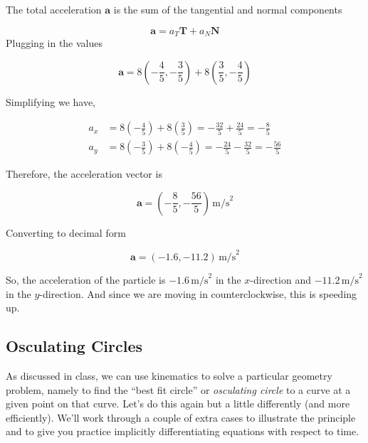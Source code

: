 \documentclass[12pt]{article}
\begin{document}
\begin{enumerate}
The total acceleration \(\mathbf{a}\) is the sum of the tangential and normal components

\[
\mathbf{a} = a_T \mathbf{T} + a_N \mathbf{N}
\]
Plugging in the values

\[
\mathbf{a} = 8 \left( -\frac{4}{5}, -\frac{3}{5} \right) + 8 \left( \frac{3}{5}, -\frac{4}{5} \right)
\]

Simplifying we have,

\begin{align*}
a_x &= 8 \left( -\frac{4}{5} \right) + 8 \left( \frac{3}{5} \right) = -\frac{32}{5} + \frac{24}{5} = -\frac{8}{5} \\
a_y &= 8 \left( -\frac{3}{5} \right) + 8 \left( -\frac{4}{5} \right) = -\frac{24}{5} - \frac{32}{5} = -\frac{56}{5}
\end{align*}


Therefore, the acceleration vector is

\[
\mathbf{a} = \left( -\frac{8}{5}, -\frac{56}{5} \right) \, \text{m/s}^2
\]

Converting to decimal form

\[
\mathbf{a} = \left( -1.6, -11.2 \right) \, \text{m/s}^2
\]

So, the acceleration of the particle is \(-1.6 \, \text{m/s}^2\) in the \(x\)-direction and \(-11.2 \, \text{m/s}^2\) in the \(y\)-direction. And since we are moving in counterclockwise, this is speeding up. 
    


\end{enumerate}


\subsection{Osculating Circles}
As discussed in class, we can use kinematics to solve a particular geometry problem, namely to find the “best fit circle” or \textit{osculating circle} to a curve at a given point on that curve. Let’s do this again but a little differently (and more efficiently). We’ll work through a couple of extra cases to illustrate the principle and to give you practice implicitly differentiating equations with respect to time.
\end{document}
